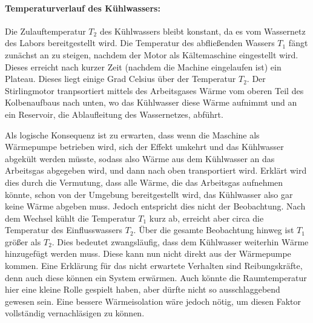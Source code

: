 
\paragraph{Temperaturverlauf des Kühlwassers:}
Die Zulauftemperatur \(T_2\) des Kühlwassers bleibt konstant, da es vom Wassernetz des Labors bereitgestellt wird. 
Die Temperatur des abfließenden Wassers \(T_1\) fängt zunächst an zu steigen, nachdem der Motor als Kältemaschine eingestellt wird. Dieses erreicht nach kurzer Zeit (nachdem die Machine eingelaufen ist) ein Plateau. Dieses liegt einige Grad Celsius über der Temperatur \(T_2\). 
Der Stirlingmotor tranpsortiert mittels des Arbeitsgases Wärme vom oberen Teil des Kolbenaufbaus nach unten, wo das Kühlwasser diese Wärme aufnimmt und an ein Reservoir, die Ablaufleitung des Wassernetzes, abführt.  

Als logische Konsequenz ist zu erwarten, dass wenn die Maschine als Wärmepumpe betrieben wird, sich der Effekt umkehrt und das Kühlwasser abgekült werden müsste, sodass also Wärme aus dem Kühlwasser an das Arbeitsgas abgegeben wird, und dann nach oben transportiert wird. Erklärt wird dies durch die Vermutung, dass alle Wärme, die das Arbeitsgas aufnehmen könnte, schon von der Umgebung bereitgestellt wird, das Kühlwasser also gar keine Wärme abgeben muss. 
Jedoch entspricht dies nicht der Beobachtung. Nach dem Wechsel kühlt die Temperatur \(T_1\) kurz ab, erreicht aber circa die Temperatur des Einflusswassers \(T_2\). Über die gesamte Beobachtung hinweg ist \(T_1\) größer als \(T_2\). Dies bedeutet zwangsläufig, dass dem Kühlwasser weiterhin Wärme hinzugefügt werden muss. Diese kann nun nicht direkt aus der Wärmepumpe kommen.
Eine Erklärung für das nicht erwartete Verhalten sind Reibungskräfte, denn auch diese können ein System erwärmen. Auch könnte die Raumtemperatur hier eine kleine Rolle gespielt haben, aber dürfte nicht so ausschlaggebend gewesen sein. Eine bessere Wärmeisolation wäre jedoch nötig, um diesen Faktor vollständig vernachläsigen zu können. 

